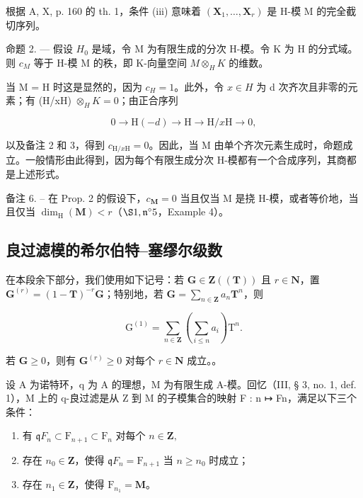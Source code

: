 根据 A, X, p. 160 的 th. 1，条件 (iii) 意味着 \((\mathbf{X}_{1}, \ldots, \mathbf{X}_{r})\) 是 H-模 M 的完全截切序列。

命题 2. --- 假设 \(H_{0}\) 是域，令 M 为有限生成的分次 H-模。令 K 为 H 的分式域。则 \(c_{M}\) 等于 H-模 M 的秩，即 K-向量空间 \(M \otimes_{H} K\) 的维数。

当 M = H 时这是显然的，因为 \(c_{H} = 1\)。此外，令 \(x \in H\) 为 d 次齐次且非零的元素；有 (H/xH) \(\otimes_{H} K = 0\)；由正合序列

\[
0 \rightarrow \mathrm{H} (- d) \rightarrow \mathrm{H} \rightarrow \mathrm{H} / x \mathrm{H} \rightarrow 0,
\]

以及备注 2 和 3，得到 \(c_{\mathrm{H}/x\mathrm{H}}=0\)。因此，当 M 由单个齐次元素生成时，命题成立。一般情形由此得到，因为每个有限生成分次 H-模都有一个合成序列，其商都是上述形式。

备注 6. -- 在 Prop. 2 的假设下，\(c_{\mathbf{M}} = 0\) 当且仅当 M 是挠 H-模，或者等价地，当且仅当 \(\dim_{\mathrm{H}}(\mathbf{M}) < r\)（\(\S 1, \mathfrak{n}^{\circ} 5\)，Example 4）。

\subsection{良过滤模的希尔伯特–塞缪尔级数}

在本段余下部分，我们使用如下记号：若 \(\mathbf{G} \in \mathbf{Z}((\mathbf{T}))\) 且 \(r \in \mathbf{N}\)，置 \(\mathbf{G}^{(r)} = (1 - \mathbf{T})^{-r}\mathbf{G}\)；特别地，若 \(\mathbf{G} = \sum_{n \in \mathbf{Z}} a_n \mathbf{T}^n\)，则

\[
\mathrm{G} ^ {(1)} = \sum_ {n \in \mathbf {Z}} \left(\sum_ {i \leqslant n} a _ {i}\right) \mathrm{T} ^ {n}.
\]

若 \(\mathbf{G} \geqslant 0\)，则有 \(\mathbf{G}^{(r)} \geqslant 0\) 对每个 \(r \in \mathbf{N}\) 成立。。

设 A 为诺特环，q 为 A 的理想，M 为有限生成 A-模。回忆（III, § 3, no. 1, def. 1），M 上的 q-良过滤是从 Z 到 M 的子模集合的映射 F : n ↦ Fn，满足以下三个条件：

\begin{enumerate}
\def\labelenumi{\alph{enumi})}
\item
  有 \(\mathfrak{q}F_n\subset \mathrm{F}_{n + 1}\subset \mathrm{F}_n\) 对每个 \(n\in \mathbf{Z},\)
\item
  存在 \(n_0 \in \mathbf{Z}\)，使得 \(\mathfrak{q}F_n = \mathrm{F}_{n+1}\) 当 \(n \geqslant n_0\) 时成立；
\item
  存在 \(n_{1} \in \mathbf{Z}\)，使得 \(\mathrm{F}_{n_1} = \mathbf{M}\)。
\end{enumerate}

